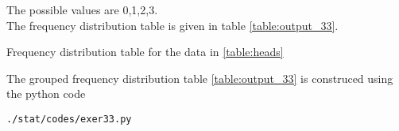 The possible values are 0,1,2,3.\\
The frequency distribution table is given in table \ref{table:output_33}.
\begin{table}[ht!]
\centering

\caption{Frequency distribution table for the data in \ref{table:heads}}
\label{table:output_33}
\end{table}
The grouped frequency distribution table \ref{table:output_33} is construced using the python code
\begin{lstlisting}
./stat/codes/exer33.py
\end{lstlisting}
